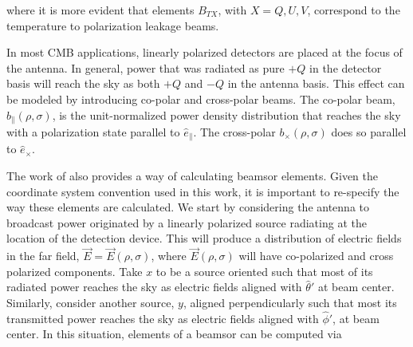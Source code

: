 \documentclass[a4paper,11pt]{article}
\newcommand{\co}{\mathbin{\|}}
\newcommand{\cx}{\mathbin{\times}}
\begin{document}
\noindent
where it is more evident that elements $B_{TX}$, with $X=Q,U,V$, correspond to the temperature to polarization leakage beams. 

In most CMB applications, linearly polarized detectors are placed at the focus of the antenna. In general, power that was radiated as pure $+Q$ in the detector basis will reach the sky as both $+Q$ and $-Q$ in the antenna basis. This effect can be modeled by introducing co-polar and cross-polar beams. The co-polar beam, $b_{\co}(\rho,\sigma)$, is the unit-normalized power density distribution that reaches the sky with a polarization state parallel to $\hat{e}_{\co}$. The cross-polar $b_{\cx}(\rho,\sigma)$ does so parallel to $\hat{e}_{\cx}$. 

The work of \cite{2007A&A...470..771J} also provides a way of calculating beamsor elements. Given the coordinate system convention used in this work, it is important to re-specify the way these elements are calculated. We start by considering the antenna to broadcast power originated by a linearly polarized source radiating at the location of the detection device. This will produce a distribution of electric fields in the far field, $\vec{E} = \vec{E}(\rho,\sigma)$, where $\vec{E}(\rho,\sigma)$ will have co-polarized and cross polarized components. Take $x$ to be a source oriented such that most of its radiated power reaches the sky as electric fields aligned with $\hat{\theta}'$ at beam center. Similarly, consider another source, $y$, aligned perpendicularly such that most its transmitted power reaches the sky as electric fields aligned with $\hat{\phi}'$, at beam center. In this situation, elements of a beamsor can be computed via
\end{document}
